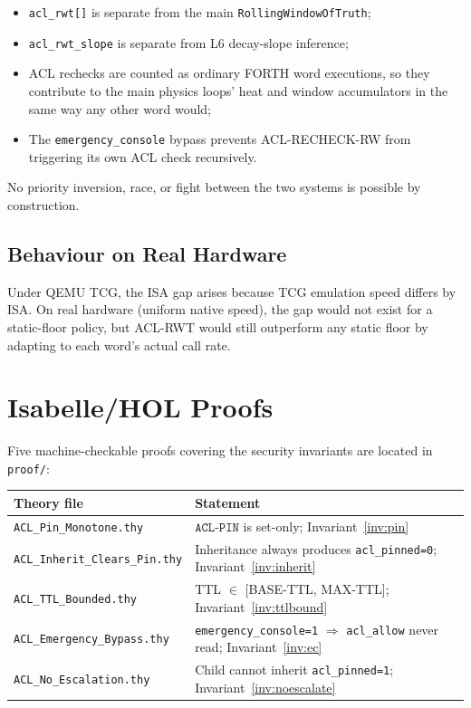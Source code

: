 \documentclass[11pt,letterpaper,openany]{article}
\newcommand{\acl}[1]{\texttt{#1}}
\begin{document}
\begin{itemize}
  \item \texttt{acl\_rwt[]} is separate from the main \texttt{RollingWindowOfTruth};
  \item \texttt{acl\_rwt\_slope} is separate from L6 decay-slope inference;
  \item ACL rechecks are counted as ordinary FORTH word executions, so
    they contribute to the main physics loops' heat and window
    accumulators in the same way any other word would;
  \item The \texttt{emergency\_console} bypass prevents ACL-RECHECK-RW
    from triggering its own ACL check recursively.
\end{itemize}

No priority inversion, race, or fight between the two systems is
possible by construction.

\subsection{Behaviour on Real Hardware}

Under QEMU TCG, the ISA gap arises because TCG emulation speed
differs by ISA.  On real hardware (uniform native speed), the gap
would not exist for a static-floor policy, but ACL-RWT would still
outperform any static floor by adapting to each word's actual call
rate.

\section{Isabelle/HOL Proofs}
\label{sec:proofs}

Five machine-checkable proofs covering the security invariants are
located in \texttt{proof/}:

\begin{center}
\begin{tabular}{lp{9cm}}
\toprule
\textbf{Theory file} & \textbf{Statement} \\
\midrule
\texttt{ACL\_Pin\_Monotone.thy}      & $\acl{ACL-PIN}$ is set-only; Invariant~\ref{inv:pin} \\
\texttt{ACL\_Inherit\_Clears\_Pin.thy} & Inheritance always produces \texttt{acl\_pinned=0}; Invariant~\ref{inv:inherit} \\
\texttt{ACL\_TTL\_Bounded.thy}       & TTL $\in$ [BASE-TTL, MAX-TTL]; Invariant~\ref{inv:ttlbound} \\
\texttt{ACL\_Emergency\_Bypass.thy}  & \texttt{emergency\_console=1} $\Rightarrow$ \texttt{acl\_allow} never read; Invariant~\ref{inv:ec} \\
\texttt{ACL\_No\_Escalation.thy}     & Child cannot inherit \texttt{acl\_pinned=1}; Invariant~\ref{inv:noescalate} \\
\bottomrule
\end{tabular}
\end{center}
\end{document}
